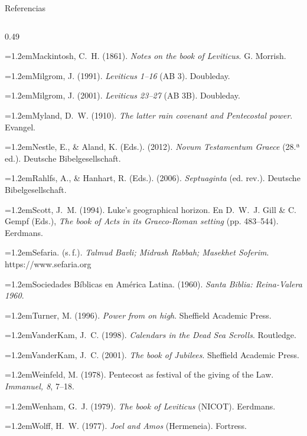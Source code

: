 \documentclass[hyperref={bookmarks=false},aspectratio=169]{beamer}
\newcommand{\refapa}[1]{\par{\RaggedRight\hangindent=1.2em\hangafter=1\noindent #1\par}\vspace{3pt}}
\begin{document}
\begin{frame}{Referencias}
\begin{columns}[t,onlytextwidth]
\begin{column}{0.49\textwidth}
\refapa{Mackintosh, C.~H. (1861). \emph{Notes on the book of Leviticus}. G. Morrish.}
\refapa{Milgrom, J. (1991). \emph{Leviticus 1--16} (AB 3). Doubleday.}
\refapa{Milgrom, J. (2001). \emph{Leviticus 23--27} (AB 3B). Doubleday.}
\refapa{Myland, D.~W. (1910). \emph{The latter rain covenant and Pentecostal power}. Evangel.}
\refapa{Nestle, E., \& Aland, K. (Eds.). (2012). \emph{Novum Testamentum Graece} (28.ª ed.). Deutsche Bibelgesellschaft.}
\refapa{Rahlfs, A., \& Hanhart, R. (Eds.). (2006). \emph{Septuaginta} (ed. rev.). Deutsche Bibelgesellschaft.}
\refapa{Scott, J.~M. (1994). Luke's geographical horizon. En D.~W.~J. Gill \& C. Gempf (Eds.), \emph{The book of Acts in its Graeco-Roman setting} (pp. 483--544). Eerdmans.}
\refapa{Sefaria. (s.\,f.). \emph{Talmud Bavli; Midrash Rabbah; Masekhet Soferim}. https://www.sefaria.org}
\refapa{Sociedades Bíblicas en América Latina. (1960). \emph{Santa Biblia: Reina-Valera 1960}.}
\refapa{Turner, M. (1996). \emph{Power from on high}. Sheffield Academic Press.}
\refapa{VanderKam, J.~C. (1998). \emph{Calendars in the Dead Sea Scrolls}. Routledge.}
\refapa{VanderKam, J.~C. (2001). \emph{The book of Jubilees}. Sheffield Academic Press.}
\refapa{Weinfeld, M. (1978). Pentecost as festival of the giving of the Law. \emph{Immanuel, 8}, 7--18.}
\refapa{Wenham, G.~J. (1979). \emph{The book of Leviticus} (NICOT). Eerdmans.}
\refapa{Wolff, H.~W. (1977). \emph{Joel and Amos} (Hermeneia). Fortress.}
\end{column}
\end{columns}
\end{frame}
\end{document}
